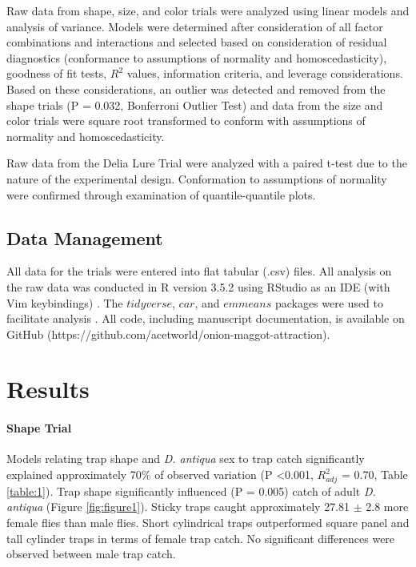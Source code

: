 \documentclass[alpha-refs]{wiley-article}
\begin{document}
Raw data from shape, size, and color trials were analyzed using linear models and analysis of variance.  Models were determined after consideration of all factor combinations and interactions and selected based on consideration of residual diagnostics (conformance to assumptions of normality and homoscedasticity), goodness of fit tests, $R^2$ values, information criteria, and leverage considerations. Based on these considerations, an outlier was detected and removed from the shape trials (P = 0.032, Bonferroni Outlier Test) and data from the size and color trials were square root transformed to conform with assumptions of normality and homoscedasticity.    

Raw data from the Delia Lure Trial were analyzed with a paired t-test due to the nature of the experimental design.  Conformation to assumptions of normality were confirmed through examination of quantile-quantile plots.

\subsection{Data Management}

All data for the trials were entered into flat tabular (.csv) files.  All analysis on the raw data was conducted in R version 3.5.2 using RStudio as an IDE (with Vim keybindings) \citep{rcore2018,rstudio}.  The $tidyverse$, $car$, and $emmeans$ packages were used to facilitate analysis \citep{tidy, car, emmeans}.  All code, including manuscript documentation, is available on GitHub (https://github.com/acetworld/onion-maggot-attraction).

\section{Results}


\paragraph{Shape Trial} Models relating trap shape and \textit{D. antiqua} sex to trap catch significantly explained approximately 70\% of observed variation (P \textless 0.001, $R^2_{adj}$ = 0.70, Table \ref{table:1}).  Trap shape significantly influenced (P = 0.005) catch of adult \textit{D. antiqua} (Figure \ref{fig:figure1}).  Sticky traps caught approximately 27.81 $\pm$ 2.8 more female flies than male flies.  Short cylindrical traps outperformed square panel and tall cylinder traps in terms of female trap catch.  No significant differences were observed between male trap catch.  
\end{document}
